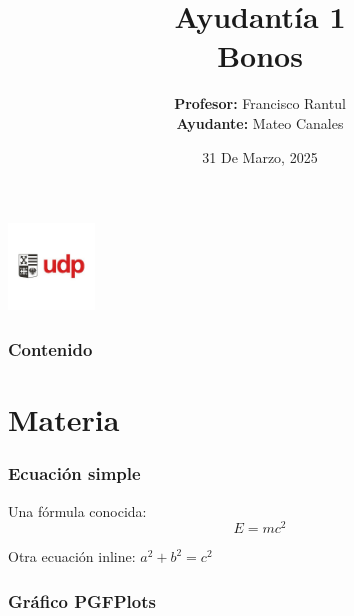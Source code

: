 \documentclass{beamer}
\title{Ayudantía 1 \\ Bonos}
\author{
  \texorpdfstring{
    \textbf{Profesor:} Francisco Rantul \\[0.3em]
    \textbf{Ayudante:} Mateo Canales
  }{Profesor: Francisco Rantul, Ayudante: Mateo Canales}
}
\institute{instrumentos Derivados}
\date{31 De Marzo, 2025}
\begin{document}
\begin{frame}
    \titlepage
    \vfill
    \centering
    \includegraphics[width=2.3118cm]{../imagenes/logo.png}
  \end{frame}
\begin{frame}
  \frametitle{Contenido}
  \tableofcontents
\end{frame}

\section{Materia}

\begin{frame}
    \frametitle{Ecuación simple}
    Una fórmula conocida:
    \[
        E = mc^2
        \]
        
        Otra ecuación inline: \( a^2 + b^2 = c^2 \)
    \end{frame}
    \begin{frame}
        \frametitle{Gráfico PGFPlots}
    \end{frame}
    
\end{document}

